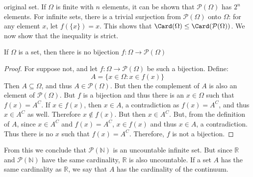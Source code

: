 \documentclass[crop=false,class=book,oneside]{standalone}
\begin{document}
            original set. If $\Omega$ is finite with $n$ elements, it
            can be shown that $\mathcal{P}(\Omega)$ has $2^{n}$
            elements. For infinite sets, there is a trivial surjection
            from $\mathcal{P}(\Omega)$ onto $\Omega$: for any element
            $x$, let $f(\{x\})=x$. This shows that
            $\Card(\Omega)\leq\Card(\mathcal{P}(\Omega))$. We now show
            that the inequality is strict.
            \begin{theorem}
                If $\Omega$ is a set, then there is no bijection
                $f:\Omega\rightarrow\mathcal{P}(\Omega)$
            \end{theorem}
            \begin{proof}
                For suppose not, and let
                $f:\Omega\rightarrow\mathcal{P}(\Omega)$ be such a
                bijection. Define:
                \begin{equation}
                    A=\{x\in\Omega:x\in{f}(x)\}
                \end{equation}
                Then $A\subseteq\Omega$, and thus
                $A\in\mathcal{P}(\Omega)$. But then the complement of
                $A$ is also an element of $\mathcal{P}(\Omega)$. But
                $f$ is a bijection and thus there is an $x\in\Omega$
                such that $f(x)=A^{C}$. If $x\in{f}(x)$, then
                $x\in{A}$, a contradiction as $f(x)=A^{C}$, and thus
                $x\in{A}^{C}$ as well. Therefore $x\notin{f}(x)$. But
                then $x\in{A}^{C}$. But, from the definition of $A$,
                since $x\in{A}^{C}$ and $f(x)=A^{C}$, $x\in{f}(x)$
                and thus $x\in{A}$, a contradiction. Thus there is no
                $x$ such that $f(x)=A^{C}$. Therefore, $f$ is not a
                bijection.
            \end{proof}
            From this we conclude that $\mathcal{P}(\mathbb{N})$
            is an uncountable infinite set. But since $\mathbb{R}$
            and $\mathcal{P}(\mathbb{N})$ have the same cardinality,
            $\mathbb{R}$ is also uncountable.
            If a set $A$ has the same cardinality as $\mathbb{R}$,
            we say that $A$ has the cardinality of the continuum.
\end{document}
